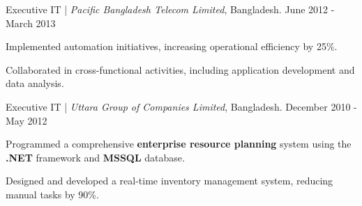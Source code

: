 \begin{cventries2}
  \cventrynew
    {Executive IT | \textnormal{\textit{Pacific Bangladesh Telecom Limited}, Bangladesh.}} %
    {June 2012 - March 2013} %
    {
      \begin{cvitems} %
        \item {Implemented automation initiatives, increasing operational efficiency by 25\%.}
        \item {Collaborated in cross-functional activities, including application development and data analysis.}
      \end{cvitems}
    }

  \cventrynew
    {Executive IT | \textnormal{\textit{Uttara Group of Companies Limited}, Bangladesh.}} %
    {December 2010 - May 2012} %
    {
      \begin{cvitems} %
        \item {Programmed a comprehensive {\bf enterprise resource planning} system using the {\bf .NET} framework and {\bf MSSQL} database.}
        \item {Designed and developed a real-time inventory management system, reducing manual tasks by 90\%.}
      \end{cvitems}
    }

\end{cventries2}
